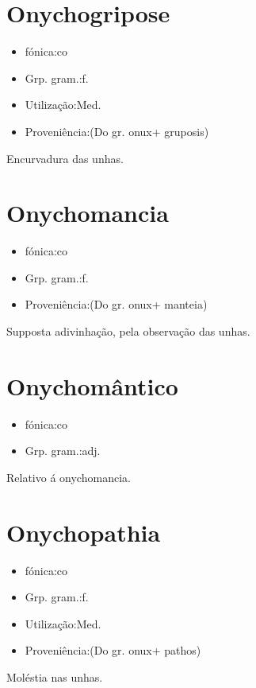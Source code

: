\section{Onychogripose}
\begin{itemize}
\item {fónica:co}
\end{itemize}
\begin{itemize}
\item {Grp. gram.:f.}
\end{itemize}
\begin{itemize}
\item {Utilização:Med.}
\end{itemize}
\begin{itemize}
\item {Proveniência:(Do gr. \textunderscore onux\textunderscore  + \textunderscore gruposis\textunderscore )}
\end{itemize}
Encurvadura das unhas.
\section{Onychomancia}
\begin{itemize}
\item {fónica:co}
\end{itemize}
\begin{itemize}
\item {Grp. gram.:f.}
\end{itemize}
\begin{itemize}
\item {Proveniência:(Do gr. \textunderscore onux\textunderscore  + \textunderscore manteia\textunderscore )}
\end{itemize}
Supposta adivinhação, pela observação das unhas.
\section{Onychomântico}
\begin{itemize}
\item {fónica:co}
\end{itemize}
\begin{itemize}
\item {Grp. gram.:adj.}
\end{itemize}
Relativo á \textunderscore onychomancia\textunderscore .
\section{Onychopathia}
\begin{itemize}
\item {fónica:co}
\end{itemize}
\begin{itemize}
\item {Grp. gram.:f.}
\end{itemize}
\begin{itemize}
\item {Utilização:Med.}
\end{itemize}
\begin{itemize}
\item {Proveniência:(Do gr. \textunderscore onux\textunderscore  + \textunderscore pathos\textunderscore )}
\end{itemize}
Moléstia nas unhas.
